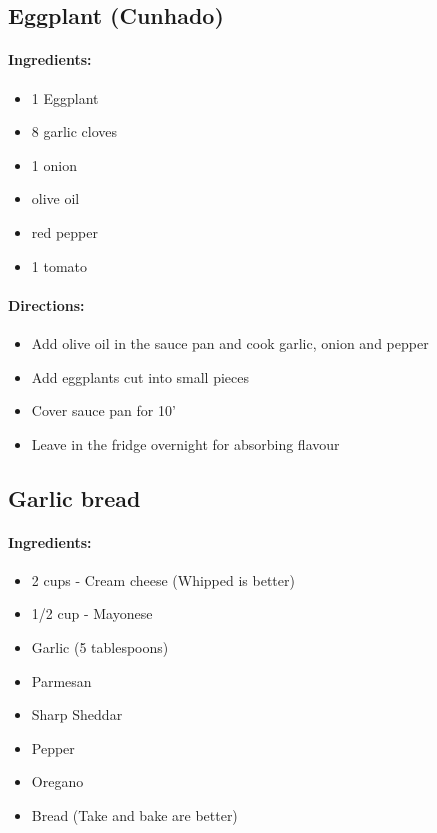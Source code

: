 \documentclass{article}
\begin{document}
\subsection{Eggplant (Cunhado)}

\paragraph{Ingredients:}

\begin{itemize}
	\item 1 Eggplant
	\item 8 garlic cloves
	\item 1 onion
	\item olive oil
	\item red pepper
	\item 1 tomato
\end{itemize}

\paragraph{Directions:}
\begin{itemize}
	\item Add olive oil in the sauce pan and cook garlic, onion and pepper
	\item Add eggplants cut into small pieces
	\item Cover sauce pan for 10'
	\item Leave in the fridge overnight for absorbing flavour
\end{itemize}

\subsection{Garlic bread}

\paragraph{Ingredients:}

\begin{itemize}
	\item 2 cups - Cream cheese (Whipped is better)
	\item 1/2 cup - Mayonese 
	\item Garlic (5 tablespoons)
	\item Parmesan
	\item Sharp Sheddar
	\item Pepper
	\item Oregano
	\item Bread (Take and bake are better)
\end{itemize}
\end{document}
